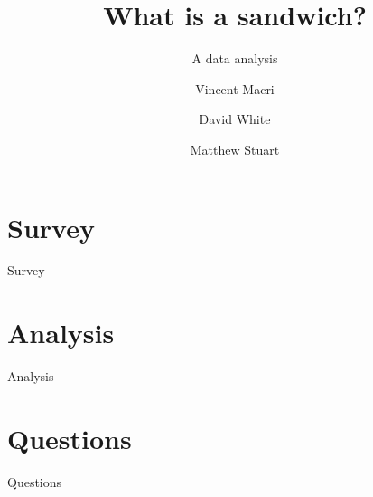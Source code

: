 

\title{What is a sandwich?}
\subtitle{A data analysis}
\author{Vincent Macri \and David White \and Matthew Stuart}


	\maketitle
	
	\tableofcontents
	\clearpage
	\part{Survey}\label{part:survey}
		{Survey}
	\part{Analysis}\label{part:analysis}
		{Analysis}
	\appendix
	\part{Questions}\label{part:appendix}
		{Questions}
	\nocite{*}
	\printbibliography

